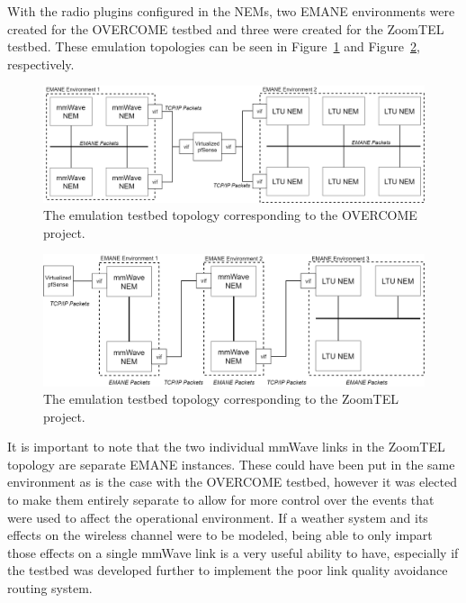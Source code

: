 With the radio plugins configured in the NEMs, two EMANE environments were created for the OVERCOME testbed and three were created for the ZoomTEL testbed.
These emulation topologies can be seen in Figure~\ref{overcome_emane} and Figure~\ref{zoomtel_emane}, respectively.
\begin{figure}[!ht]
    \centering
    \includegraphics[width=\textwidth,keepaspectratio]{Images/Chpt3/EMANE_OVERCOME.png}
    \caption{The emulation testbed topology corresponding to the OVERCOME project.}
    \label{overcome_emane}
\end{figure}
\begin{figure}[!ht]
    \centering
    \includegraphics[width=\textwidth,keepaspectratio]{Images/Chpt3/EMANE_ZoomTEL.png}
    \caption{The emulation testbed topology corresponding to the ZoomTEL project.}
    \label{zoomtel_emane}
\end{figure}
It is important to note that the two individual mmWave links in the ZoomTEL topology are separate EMANE instances.
These could have been put in the same environment as is the case with the OVERCOME testbed, however it was elected to make them entirely separate to allow for more control over the events that were used to affect the operational environment.
If a weather system and its effects on the wireless channel were to be modeled, being able to only impart those effects on a single mmWave link is a very useful ability to have, especially if the testbed was developed further to implement the poor link quality avoidance routing system.\par

